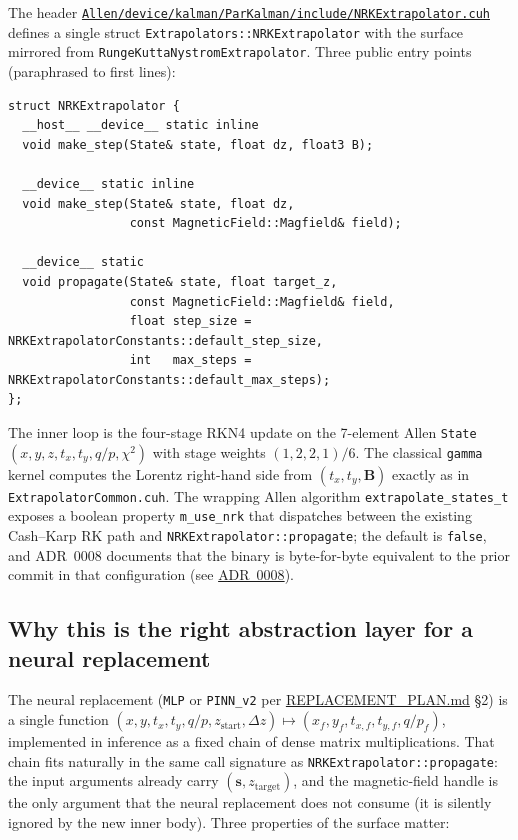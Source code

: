 \documentclass[11pt,a4paper]{article}
\newcommand{\dz}{\ensuremath{\Delta z}}
\newcommand{\state}{\ensuremath{\mathbf{s}}}
\newcommand{\code}[1]{\texttt{#1}}
\begin{document}
The header
\href{run:../../../TE_stack/Allen/device/kalman/ParKalman/include/NRKExtrapolator.cuh}{\code{Allen/device/kalman/ParKalman/include/NRKExtrapolator.cuh}}
defines a single struct \code{Extrapolators::NRKExtrapolator} with the surface
mirrored from
\code{RungeKuttaNystromExtrapolator}. Three public entry points (paraphrased
to first lines):

\begin{verbatim}
struct NRKExtrapolator {
  __host__ __device__ static inline
  void make_step(State& state, float dz, float3 B);

  __device__ static inline
  void make_step(State& state, float dz,
                 const MagneticField::Magfield& field);

  __device__ static
  void propagate(State& state, float target_z,
                 const MagneticField::Magfield& field,
                 float step_size = NRKExtrapolatorConstants::default_step_size,
                 int   max_steps = NRKExtrapolatorConstants::default_max_steps);
};
\end{verbatim}

The inner loop is the four-stage RKN4 update on the 7-element Allen \code{State}
\((x, y, z, t_x, t_y, q/p, \chi^2)\) with stage weights $(1, 2, 2, 1)/6$.
The classical \code{gamma} kernel computes the Lorentz right-hand side from
$(t_x, t_y, \mathbf{B})$ exactly as in
\code{ExtrapolatorCommon.cuh}. The wrapping Allen algorithm
\code{extrapolate\_states\_t} exposes a boolean property
\code{m\_use\_nrk} that dispatches between the existing Cash--Karp RK path
and \code{NRKExtrapolator::propagate}; the default is \code{false}, and ADR~0008
documents that the binary is byte-for-byte equivalent to the prior commit
in that configuration (see
\href{run:../../experiments/gen_3/For_Allen/docs/decisions/0008-allen-wiring-plan.md}{ADR~0008}).

\subsection{Why this is the right abstraction layer for a neural replacement}
\label{sec:why-abstraction}

The neural replacement (\code{MLP} or \code{PINN\_v2} per
\href{run:../../experiments/gen_3/REPLACEMENT_PLAN.md}{REPLACEMENT\_PLAN.md} \S2)
is a single function
\((x, y, t_x, t_y, q/p, z_\text{start}, \dz) \mapsto (x_f, y_f, t_{x,f}, t_{y,f}, q/p_f)\),
implemented in inference as a fixed chain of dense matrix multiplications.
That chain fits naturally in the same call signature as
\code{NRKExtrapolator::propagate}: the input arguments already carry
\((\state, z_\text{target})\), and the magnetic-field handle is the only
argument that the neural replacement does not consume (it is silently
ignored by the new inner body). Three properties of the surface matter:
\end{document}
